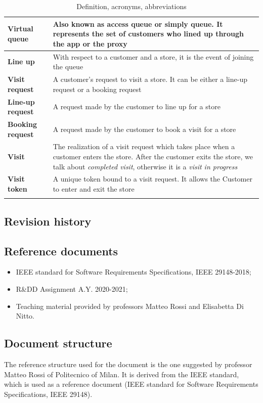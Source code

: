 \documentclass[a4paper,oneside,11pt]{book}   %
\begin{document}
\begin{longtable}[c] { |>{\bfseries{}}C{0.25\textwidth}|V{0.55\textwidth}| }
        Virtual queue & Also known as access queue or simply queue. It represents the set of customers who lined up through the app or the proxy \\ \hline
        Line up & With respect to a customer and a store, it is the event of joining the queue \\ \hline
        Visit request & A customer’s request to visit a store. It can be either a line-up request or a booking request \\ \hline
        Line-up request & A request made by the customer  to line up for a store \\ \hline
        Booking request & A request made by the customer  to book a visit for a store \\ \hline 
        Visit & The realization of a visit request which takes place when a customer enters the store. After the customer exits the store, we talk about \textit{completed visit}, otherwise it is a \textit{visit in progress} \\ \hline
        Visit token & A unique token bound to a visit request. It allows the Customer to enter and exit the store \\
        \hline
    \caption{Definition, acronyms, abbreviations}
    \label{table:definitions_acronyms_abbreviations}
    \end{longtable} %
    
    \subsection{Revision history}
    
    \subsection{Reference documents}
    \begin{itemize}
        \item IEEE standard for Software Requirements Specifications, IEEE 29148-2018;
        \item R\&DD Assignment A.Y. 2020-2021;
        \item Teaching material provided by professors Matteo Rossi and Elisabetta Di Nitto.
    \end{itemize}
      \par

    \subsection{Document structure}
    The reference structure used for the document is the one suggested by professor Matteo Rossi of Politecnico of Milan. It is derived from the IEEE standard, which is used as a reference document (IEEE standard for Software Requirements Specifications, IEEE 29148).
    
\end{document}

